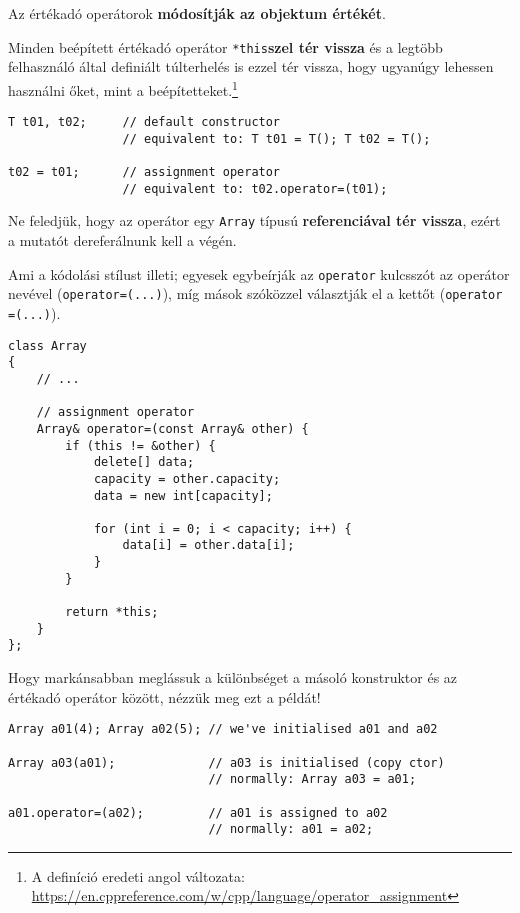 \documentclass[a4paper, 11pt, oneside]{book}
\begin{document}
\begin{tcolorbox}[title={\textbf{Értékadó operátor}}]
	Az értékadó operátorok \textbf{módosítják az objektum értékét}.
	
	Minden beépített értékadó operátor \verb*|*this|\textbf{szel tér vissza} és a legtöbb felhasználó által definiált túlterhelés is ezzel tér vissza, hogy ugyanúgy lehessen használni őket, mint a beépítetteket.\footnote{A definíció eredeti angol változata: \url{https://en.cppreference.com/w/cpp/language/operator_assignment}}
	
	\begin{lstlisting}[style=cppstyle]
T t01, t02;		// default constructor
				// equivalent to: T t01 = T(); T t02 = T();
		
t02 = t01;		// assignment operator
				// equivalent to: t02.operator=(t01);
	\end{lstlisting}
\end{tcolorbox}

Ne feledjük, hogy az operátor egy \verb*|Array| típusú \textbf{referenciával tér vissza}, ezért a mutatót dereferálnunk kell a végén.

Ami a kódolási stílust illeti; egyesek egybeírják az \verb*|operator| kulcsszót az operátor nevével (\verb*|operator=(...)|), míg mások szóközzel választják el a kettőt (\verb|operator =(...)|).

\begin{lstlisting}[style=cppstyle]
class Array 
{
	// ... 
		
	// assignment operator
	Array& operator=(const Array& other) {
		if (this != &other) {
			delete[] data;
			capacity = other.capacity;
			data = new int[capacity];
			
			for (int i = 0; i < capacity; i++) {
				data[i] = other.data[i];
			}
		}
	
		return *this;
	}
};
\end{lstlisting}

Hogy markánsabban meglássuk a különbséget a másoló konstruktor és az értékadó operátor között, nézzük meg ezt a példát!

\begin{lstlisting}[style=cppstyle]
Array a01(4); Array a02(5);	// we've initialised a01 and a02

Array a03(a01);				// a03 is initialised (copy ctor)
							// normally: Array a03 = a01;
							
a01.operator=(a02);			// a01 is assigned to a02
							// normally: a01 = a02;
\end{lstlisting}
\end{document}
